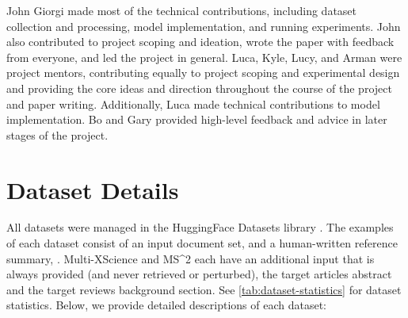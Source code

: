 \documentclass[11pt]{article}
\newcommand\mstoo{{MS\^{}2}\xspace}
\begin{document}
John Giorgi made most of the technical contributions, including dataset collection and processing, model implementation, and running experiments. John also contributed to project scoping and ideation, wrote the paper with feedback from everyone, and led the project in general. Luca, Kyle, Lucy, and Arman were project mentors, contributing equally to project scoping and experimental design and providing the core ideas and direction throughout the course of the project and paper writing. Additionally, Luca made technical contributions to model implementation. Bo and Gary provided high-level feedback and advice in later stages of the project.




\appendix

\clearpage

\section{Dataset Details}
\label{appendix:dataset-details}

All datasets were managed in the HuggingFace Datasets library \citep{hf-datasets}. The examples of each dataset consist of an input document set,  and a human-written reference summary, . Multi-XScience and \mstoo each have an additional input that is always provided (and never retrieved or perturbed), the target articles abstract and the target reviews background section. See \autoref{tab:dataset-statistics} for dataset statistics. Below, we provide detailed descriptions of each dataset:
\end{document}
